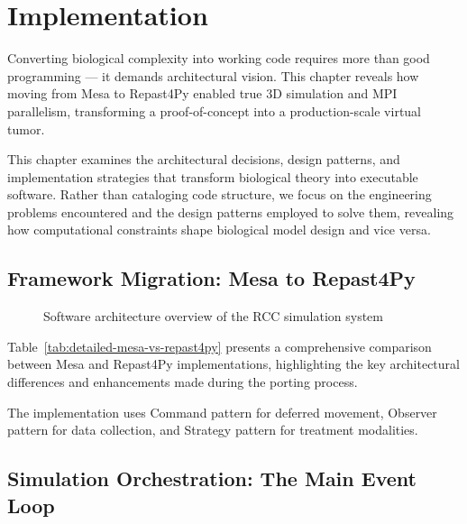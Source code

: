 \chapter{Implementation}
\label{ch:implementation}



Converting biological complexity into working code requires more than good programming --- it demands architectural vision. This chapter reveals how moving from Mesa to Repast4Py enabled true 3D simulation and MPI parallelism, transforming a proof-of-concept into a production-scale virtual tumor.

This chapter examines the architectural decisions, design patterns, and implementation strategies that transform biological theory into executable software. Rather than cataloging code structure, we focus on the engineering problems encountered and the design patterns employed to solve them, revealing how computational constraints shape biological model design and vice versa.

\section{Framework Migration: Mesa to Repast4Py}
\label{sec:framework-migration}

\begin{figure}[htbp]
\centering
{}
\caption{Software architecture overview of the RCC simulation system}
\label{fig:architecture_overview}
\end{figure}

Table~\ref{tab:detailed-mesa-vs-repast4py} presents a comprehensive comparison between Mesa and Repast4Py implementations, highlighting the key architectural differences and enhancements made during the porting process.

The implementation uses Command pattern for deferred movement, Observer pattern for data collection, and Strategy pattern for treatment modalities.



\section{Simulation Orchestration: The Main Event Loop}
\label{sec:simulation-orchestration}

